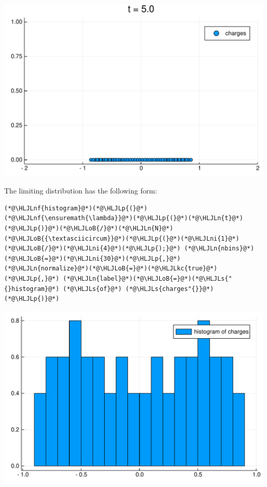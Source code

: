 \documentclass[12pt,a4paper]{article}
\newcommand{\HLJLkc}[1]{\textcolor[RGB]{59,151,46}{\textit{#1}}}
\newcommand{\HLJLn}[1]{#1}
\newcommand{\HLJLnf}[1]{\textcolor[RGB]{66,102,213}{#1}}
\newcommand{\HLJLs}[1]{\textcolor[RGB]{201,61,57}{#1}}
\newcommand{\HLJLni}[1]{\textcolor[RGB]{59,151,46}{#1}}
\newcommand{\HLJLoB}[1]{\textcolor[RGB]{102,102,102}{\textbf{#1}}}
\newcommand{\HLJLp}[1]{#1}
\begin{document}
\includegraphics[width=\linewidth]{figures/Solutions2_34_1.pdf}

The limiting distribution has the following form:


\begin{lstlisting}
(*@\HLJLnf{histogram}@*)(*@\HLJLp{(}@*)(*@\HLJLnf{\ensuremath{\lambda}}@*)(*@\HLJLp{(}@*)(*@\HLJLn{t}@*)(*@\HLJLp{)}@*)(*@\HLJLoB{/}@*)(*@\HLJLn{N}@*)(*@\HLJLoB{{\textasciicircum}}@*)(*@\HLJLp{(}@*)(*@\HLJLni{1}@*)(*@\HLJLoB{/}@*)(*@\HLJLni{4}@*)(*@\HLJLp{);}@*) (*@\HLJLn{nbins}@*)(*@\HLJLoB{=}@*)(*@\HLJLni{30}@*)(*@\HLJLp{,}@*) (*@\HLJLn{normalize}@*)(*@\HLJLoB{=}@*)(*@\HLJLkc{true}@*)(*@\HLJLp{,}@*) (*@\HLJLn{label}@*)(*@\HLJLoB{=}@*)(*@\HLJLs{"{}histogram}@*) (*@\HLJLs{of}@*) (*@\HLJLs{charges"{}}@*)(*@\HLJLp{)}@*)
\end{lstlisting}

\includegraphics[width=\linewidth]{figures/Solutions2_35_1.pdf}
\end{document}

